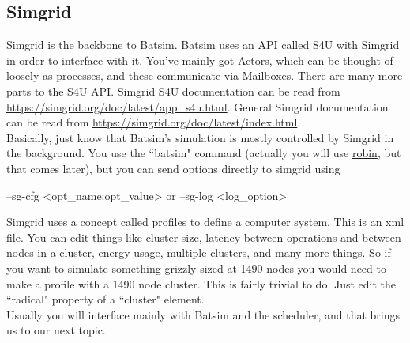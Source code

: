 \documentclass[titlepage]{article}
\newenvironment{regular}{\color{black}}{}
\begin{document}
\subsection{Simgrid}
\begin{regular}
Simgrid is the backbone to Batsim.  Batsim uses an API called S4U with Simgrid in order to interface with it.
You've mainly got Actors, which can be thought of loosely as processes, and these communicate via Mailboxes.
There are many more parts to the S4U API.  Simgrid S4U documentation can be read from \url{https://simgrid.org/doc/latest/app_s4u.html}.
General Simgrid documentation can be read from \url{https://simgrid.org/doc/latest/index.html}.\\

Basically, just know that Batsim's simulation is mostly controlled by Simgrid in the background.  You use the
``batsim" command (actually you will use \hyperlink{how_to_robin}{robin}, but that comes later), but you can send options
directly to simgrid using \\
\end{regular}
\begin{code}
--sg-cfg <opt_name:opt_value>
or
--sg-log <log_option>
\end{code}
\begin{regular}
Simgrid uses a concept called profiles to define a computer system.  This is an xml file.  You can edit things like
cluster size, latency between operations and between nodes in a cluster, energy usage, multiple clusters, and many more things.
So if you want to simulate something grizzly sized at 1490 nodes you would need to make a profile with a 1490 node
cluster.  This is fairly trivial to do.  Just edit the ``radical" property of a ``cluster" element.\\

Usually you will interface mainly with Batsim and the scheduler, and that brings us to our next topic.
\end{regular}

\hypertarget{intro_batsim_vs_batsched}{}
\end{document}
